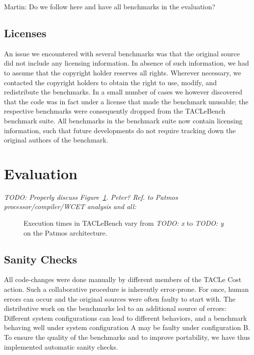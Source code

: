\documentclass[a4paper,UKenglish]{oasics}
\newcommand{\todo}[1]{{\emph{TODO: #1}}}
\newcommand{\martin}[1]{{\color{blue} Martin: #1}}
\begin{document}
\martin{Do we follow here and have all benchmarks in the evaluation?}


\subsection{Licenses}

An issue we encountered with several benchmarks was that the original
source did not include any licensing information. In absence of such
information, we had to assume that the copyright holder reserves all
rights. Wherever necessary, we contacted the copyright holders to
obtain the right to use, modify, and redistribute the benchmarks. In a
small number of cases we however discovered that the code was in fact
under a license that made the benchmark unusable; the respective
benchmarks were consequently dropped from the TACLeBench benchmark
suite. All benchmarks in the benchmark suite now contain licensing
information, such that future developments do not require tracking
down the original authors of the benchmark.



\section{Evaluation}
\label{sec:eval}


\todo{Properly discuss Figure~\ref{fig:execution-times}. Peter? Ref. to Patmos processor/compiler/WCET analysis
and all: \cite{t-crest:2015}}

\begin{figure}[t]
  \def\resultfile{eval/wcet.csv}
  
  \caption{Execution times in TACLeBench vary from \todo{x} to \todo{y} on the Patmos architecture.}
  \label{fig:execution-times}
\end{figure}

\subsection{Sanity Checks}
All code-changes were done manually by different members of the TACLe Cost action.
Such a collaborative procedure is inherently error-prone.
For once, human errors can occur and the original sources were often faulty to start with.
The distributive work on the benchmarks led to an additional source of errors:
Different system configurations can lead to different behaviors, and a benchmark behaving well under system configuration A may be faulty under configuration B.
To ensure the quality of the benchmarks and to improve portability, we have thus implemented automatic sanity checks.
\end{document}
